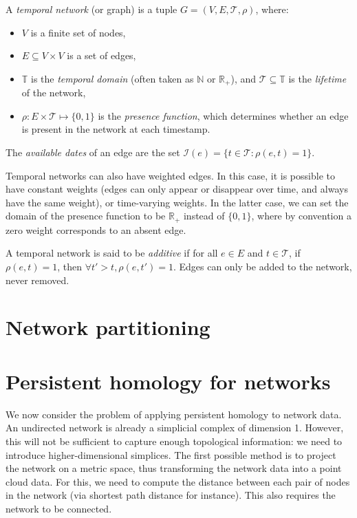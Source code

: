 \documentclass[a4paper,11pt,openany,extrafontsizes]{memoir}
\begin{document}
\begin{defn}
  A \emph{temporal network} (or graph) is a tuple
  $G = (V, E, \mathcal{T}, \rho)$, where:
  \begin{itemize}
  \item $V$ is a finite set of nodes,
  \item $E\subseteq V\times V$ is a set of edges,
  \item $\mathbb{T}$ is the \emph{temporal domain} (often taken as
    $\mathbb{N}$ or $\mathbb{R}_+$), and
    $\mathcal{T}\subseteq\mathbb{T}$ is the \emph{lifetime} of the
    network,
  \item $\rho: E\times\mathcal{T}\mapsto\{0,1\}$ is the \emph{presence
      function}, which determines whether an edge is present in the
    network at each timestamp.
  \end{itemize}
  The \emph{available dates} of an edge are the set
  $\mathcal{I}(e) = \{t\in\mathcal{T}: \rho(e,t)=1\}$.
\end{defn}

Temporal networks can also have weighted edges. In this case, it is
possible to have constant weights (edges can only appear or disappear
over time, and always have the same weight), or time-varying
weights. In the latter case, we can set the domain of the presence
function to be $\mathbb{R}_+$ instead of $\{0,1\}$, where by
convention a zero weight corresponds to an absent edge.

\begin{defn}
  A temporal network is said to be \emph{additive} if for all $e\in E$
  and $t\in\mathcal{T}$, if $\rho(e,t)=1$, then
  $\forall t'>t, \rho(e, t') = 1$. Edges can only be added to the
  network, never removed.
\end{defn}

\section{Network partitioning}%
\label{sec:network-partitioning}

\section{Persistent homology for networks}%
\label{sec:pers-homol-netw}

We now consider the problem of applying persistent homology to network
data. An undirected network is already a simplicial complex of
dimension 1. However, this will not be sufficient to capture enough
topological information: we need to introduce higher-dimensional
simplices. The first possible method is to project the network on a
metric space, thus transforming the network data into a point cloud
data. For this, we need to compute the distance between each pair of
nodes in the network (via shortest path distance for instance). This
also requires the network to be connected.
\end{document}

